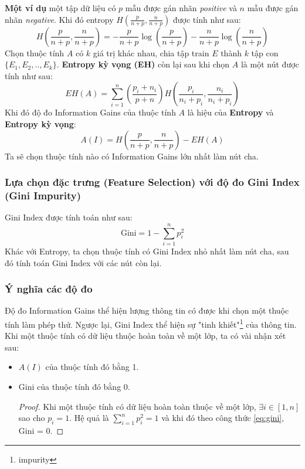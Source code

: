 \documentclass[12pt]{article}
\begin{document}
\textbf{Một ví dụ} một tập dữ liệu có $p$ mẫu được gán nhãn \textit{positive} và $n$ mẫu được gán nhãn \textit{negative}. Khi đó entropy $H(\frac{p}{n + p}, \frac{n}{n + p})$ được tính như sau:
$$
H\left(\frac{p}{n + p}, \frac{n}{n + p}\right) = -\frac{p}{n + p}\log\left(\frac{p}{n + p}\right) - \frac{n}{n + p}\log\left(\frac{n}{n + p}\right)
$$
Chọn thuộc tính $A$ có $k$ giá trị khác nhau, chia tập train $E$ thành $k$ tập con $\{E_1, E_2, .., E_k\}$. \textbf{Entropy kỳ vọng (EH)} còn lại sau khi chọn $A$ là một nút được tính như sau:
\begin{equation}
EH(A) = \sum_{i = 1}^{n}\left(\frac{p_i + n_i}{p + n}\right)H\left(\frac{p_i}{n_i + p_i}, \frac{n_i}{n_i + p_i}\right)
\end{equation}
Khi đó độ đo Information Gains của thuộc tính $A$ là hiệu của \textbf{Entropy} và \textbf{Entropy kỳ vọng}:
\begin{equation}
A(I) = H\left(\frac{p}{n + p}, \frac{n}{n + p}\right) - EH(A)
\end{equation}
Ta sẽ chọn thuộc tính nào có Information Gains lớn nhất làm nút cha.

\subsubsection{Lựa chọn đặc trưng (Feature Selection) với độ đo Gini Index (Gini Impurity)}
Gini Index được tính toán như sau:
\begin{equation}\label{eq:gini}
\text{Gini} = 1 - \sum_{i = 1}^n p_i ^ 2
\end{equation}
Khác với Entropy, ta chọn thuộc tính có Gini Index nhỏ nhất làm nút cha, sau đó tính toán Gini Index với các nút còn lại.

\subsubsection{Ý nghĩa các độ đo}
Độ đo Information Gains thể hiện lượng thông tin có được khi chọn một thuộc tính làm phép thử. Ngược lại, Gini Index thể hiện sự "tinh khiết"\footnote{impurity} của thông tin. Khi một thuộc tính có dữ liệu thuộc hoàn toàn về một lớp, ta có vài nhận xét sau:
\begin{itemize}
\item $A(I)$ của thuộc tính đó bằng 1.
\item Gini của thuộc tính đó bằng 0.
\begin{proof}
Khi một thuộc tính có dữ liệu hoàn toàn thuộc về một lớp, $\exists i \in [1, n]$ sao cho $p_i = 1$. Hệ quả là $\displaystyle \sum_{i = 1}^{n} p_i^2 = 1$ và khi đó theo công thức \ref{eq:gini}, Gini = 0.
\end{proof}
\end{itemize}
\end{document}

